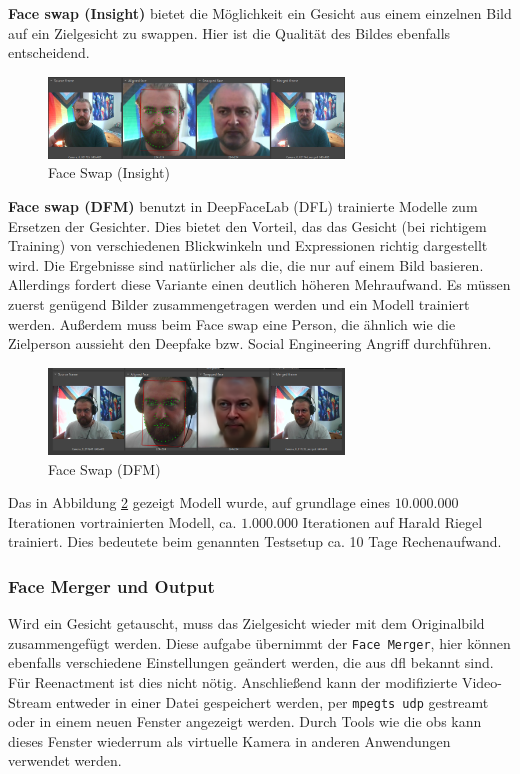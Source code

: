 \textbf{Face swap (Insight)} bietet die Möglichkeit ein Gesicht aus einem einzelnen Bild auf ein Zielgesicht zu swappen.
Hier ist die Qualität des Bildes ebenfalls entscheidend.
\begin{figure}[h]
    \center
    \includegraphics[width=0.7\textwidth]{Bilder/DFLive/Face-swap-ingsight}
    \caption{Face Swap (Insight)}
    \label{fig:dflive-insight-swapping}
\end{figure}

\textbf{Face swap (DFM)} benutzt in DeepFaceLab (DFL) trainierte Modelle zum Ersetzen der Gesichter.
Dies bietet den Vorteil, das das Gesicht (bei richtigem Training) von verschiedenen Blickwinkeln und Expressionen richtig dargestellt wird.
Die Ergebnisse sind natürlicher als die, die nur auf einem Bild basieren.
Allerdings fordert diese Variante einen deutlich höheren Mehraufwand. 
Es müssen zuerst genügend Bilder zusammengetragen werden und ein Modell trainiert werden.
Außerdem muss beim Face swap eine Person, die ähnlich wie die Zielperson aussieht den Deepfake bzw. Social Engineering Angriff durchführen.
\begin{figure}[h]
    \center
    \includegraphics[width=0.7\textwidth]{Bilder/DFLive/Face-swap-dfm}
    \caption{Face Swap (DFM)}
    \label{fig:dflive-dfm-swapping}
\end{figure}
Das in Abbildung \ref{fig:dflive-dfm-swapping} gezeigt Modell wurde, auf grundlage eines $10.000.000$ Iterationen vortrainierten Modell, ca. $1.000.000$ Iterationen auf Harald Riegel trainiert.
Dies bedeutete beim genannten Testsetup ca. 10 Tage Rechenaufwand.

\subsubsection*{Face Merger und Output}
Wird ein Gesicht getauscht, muss das Zielgesicht wieder mit dem Originalbild zusammengefügt werden.
Diese aufgabe übernimmt der \texttt{Face Merger}, hier können ebenfalls verschiedene Einstellungen geändert werden, die aus \gls{dfl} bekannt sind.
Für Reenactment ist dies nicht nötig.
Anschließend kann der modifizierte Video-Stream entweder in einer Datei gespeichert werden, per \texttt{mpegts udp} gestreamt oder in einem neuen Fenster angezeigt werden.
Durch Tools wie die \gls{obs} kann dieses Fenster wiederrum als virtuelle Kamera in anderen Anwendungen verwendet werden.

